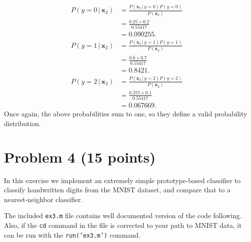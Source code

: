 \documentclass[10pt]{article}
\begin{document}
\begin{align*}
   P(y = 0 \, | \, \textbf{x}_2) &= \frac{P(\textbf{x}_2 \, | \, y = 0)P(y = 0)}{P(\textbf{x}_2)} \\
                                             &= \frac{0.25 \times 0.2}{0.55417} \\
                                             &= 0.090255. \\
   P(y = 1 \, | \, \textbf{x}_2) &= \frac{P(\textbf{x}_2 \, | \, y = 1)P(y = 1)}{P(\textbf{x}_2)} \\
                                             &= \frac{0.\bar{6} \times 0.7}{0.55417} \\
                                             &= 0.8421. \\
   P(y = 2 \, | \, \textbf{x}_2) &= \frac{P(\textbf{x}_2 \, | \, y = 2)P(y = 2)}{P(\textbf{x}_2)} \\
                                             &= \frac{0.375 \times 0.1}{0.55417} \\
                                             &= 0.067669. 
\end{align*}
Once again, the above probabilities sum to one, so they define a valid probability distribution.

\color{blue}
\section*{Problem 4 (15 points)}
In this exercise we implement an extremely simple prototype-based classifier to classify handwritten digits from the MNIST dataset, and compare that to a nearest-neighbor classifier.

\color{black}
The included \texttt{ex3.m} file contains well documented version of the code following. Also, if the \texttt{cd} command in the file is corrected to your path to MNIST data, it can be run with the \texttt{run('ex3.m')} command.

\color{blue}
\end{document}
